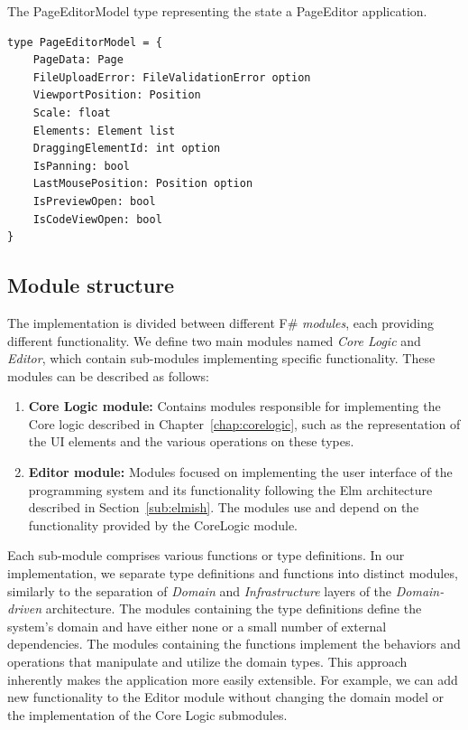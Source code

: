 \begin{listing}[htbp]
	\caption{The PageEditorModel type representing the state a PageEditor application.}
	\label{fig:editorModel}
	\begin{lstlisting}
type PageEditorModel = {
    PageData: Page
    FileUploadError: FileValidationError option
    ViewportPosition: Position
    Scale: float
    Elements: Element list
    DraggingElementId: int option
    IsPanning: bool
    LastMousePosition: Position option
    IsPreviewOpen: bool
    IsCodeViewOpen: bool
}
  \end{lstlisting}
\end{listing}
\medskip
\subsection{Module structure}
\nopagebreak[4]
The implementation is divided between different F\# \emph{modules}, each providing different functionality.
We define two main modules named \emph{Core Logic} and \emph{Editor}, which contain sub-modules implementing specific functionality.
These modules can be described as follows:
\begin{enumerate}
	\item \textbf{Core Logic module:} Contains modules responsible for implementing the Core logic described in Chapter~\ref{chap:corelogic}, such as the representation of the UI elements and the various operations on these types.
	\item \textbf{Editor module:} Modules focused on implementing the user interface of the programming system and its functionality following the Elm architecture described in Section~\ref{sub:elmish}.
	      The modules use and depend on the functionality provided by the CoreLogic module.
\end{enumerate}

Each sub-module comprises various functions or type definitions.
In our implementation, we separate type definitions and functions into distinct modules, similarly to the separation of \emph{Domain} and \emph{Infrastructure} layers of the \emph{Domain-driven} architecture.
The modules containing the type definitions define the system's domain and have either none or a small number of external dependencies.
The modules containing the functions implement the behaviors and operations that manipulate and utilize the domain types.
This approach inherently makes the application more easily extensible.
For example, we can add new functionality to the Editor module without changing the domain model or the implementation of the Core Logic submodules.
\medskip
